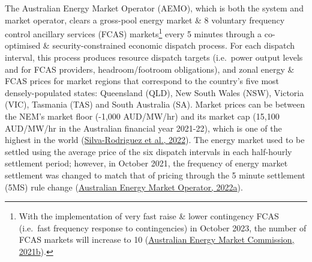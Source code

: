 \documentclass[12pt,a4paper,]{report}
\begin{document}
The Australian Energy Market Operator (AEMO), which is both the system
and market operator, clears a gross-pool energy market \& 8 voluntary
frequency control ancillary services (FCAS) markets\footnote{With the
  implementation of very fast raise \& lower contingency FCAS (i.e.~fast
  frequency response to contingencies) in October 2023, the number of
  FCAS markets will increase to 10
  (\protect\hyperlink{ref-australianenergymarketcommissionFastFrequencyResponse2021}{Australian
  Energy Market Commission, 2021b}).} every 5 minutes through a
co-optimised \& security-constrained economic dispatch process. For each
dispatch interval, this process produces resource dispatch targets
(i.e.~power output levels and for FCAS providers, headroom/footroom
obligations), and zonal energy \& FCAS prices for market regions that
correspond to the country's five most densely-populated states:
Queensland (QLD), New South Wales (NSW), Victoria (VIC), Tasmania (TAS)
and South Australia (SA). Market prices can be between the NEM's market
floor (-1,000 AUD/MW/hr) and its market cap (15,100 AUD/MW/hr in the
Australian financial year 2021-22), which is one of the highest in the
world
(\protect\hyperlink{ref-silva-rodriguezShortTermWholesale2022}{Silva-Rodriguez
et al., 2022}). The energy market used to be settled using the average
price of the six dispatch intervals in each half-hourly settlement
period; however, in October 2021, the frequency of energy market
settlement was changed to match that of pricing through the 5 minute
settlement (5MS) rule change
(\protect\hyperlink{ref-australianenergymarketoperator5MSCommencement2022}{Australian
Energy Market Operator, 2022a}).
\end{document}
